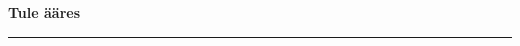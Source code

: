 \documentclass[10pt]{book}
\begin{document}
{
  \samepage
  \raggedbottom
  \raggedright
  \sloppy


  \vspace{0.2in}

  \noindent\begin{minipage}{.1\textwidth}
    \hfill\vspace{0.1in}
  \end{minipage}%
  \noindent\begin{minipage}{.8\textwidth}
    \centering
    \bfseries
    \large Tule \"a\"ares	
  \end{minipage}%
  \noindent\begin{minipage}{.1\textwidth}
      \hfill\vspace{0.1in}
  \end{minipage}

  \nopagebreak[4]
  \vspace{0.1in}
  \nopagebreak[4]
  \hrule height 0.05ex
  \nopagebreak[4]
  \vspace{-0.05in}




}
\end{document}
